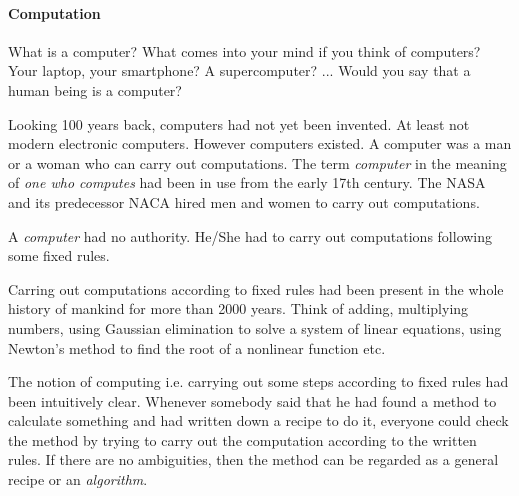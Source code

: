 \begin{comment}
        Polymorphic types (System F): Adding List X, Array X, Pair X Y. Type
        functions mapping types to types.

        Polymorphic functions (System Fω): reverse List X. Functions mapping
        types and objects to objects.

        Dependent types for logic: Expressing type ∀x. P x. An object of this
        type is a function which maps an object x to a proof of P x.
        Computational objects appearing in types.

    Calculus of constructions: Expressive in terms of functions it can express
    and in terms of logical statements it can express. Sweet spot in the desigs
    space of typed lambda calculi.
\end{comment}




\paragraph{Computation}
What is a computer? What comes into your mind if you think of computers? Your
laptop, your smartphone? A supercomputer? ... Would you say that a human being
is a computer?

Looking 100 years back, computers had not yet been invented. At least not modern
electronic computers. However computers existed. A computer was a man or a woman
who can carry out computations. The term \emph{computer} in the meaning of
\emph{one who computes} had been in use from the early 17th century. The NASA
and its predecessor NACA hired men and women to carry out computations.

A \emph{computer} had no authority. He/She had to carry out computations
following some fixed rules.

Carring out computations according to fixed rules had been present in the whole
history of mankind for more than 2000 years. Think of adding, multiplying
numbers, using Gaussian elimination to solve a system of linear equations, using
Newton's method to find the root of a nonlinear function etc.

The notion of computing i.e. carrying out some steps according to fixed rules
had been intuitively clear. Whenever somebody said that he had found a method to
calculate something and had written down a recipe to do it, everyone could check
the method by trying to carry out the computation according to the written
rules. If there are no ambiguities, then the method can be regarded as a general
recipe or an \emph{algorithm}.



